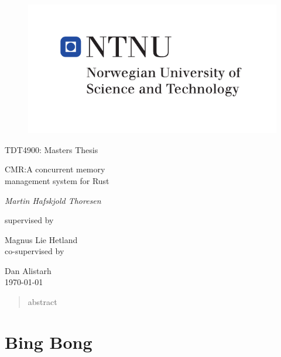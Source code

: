 \documentclass[b5paper,twoside]{report}
\theoremstyle{plain}
\theoremstyle{definition}
\begin{document}
\begin{titlepage}
  \centering
  \begin{figure}[h]
    \centering
    \includegraphics{hovedlogo_eng.pdf}
  \end{figure}
  \vspace{1.5cm}
  {\Large TDT4900: Masters Thesis \par}
  \vspace{1cm}
  {\huge CMR:\@ A concurrent memory\\ management system for Rust\par}
  \vspace{2cm}
  {\Large\itshape{}Martin Hafskjold Thoresen\par}
  \vfill
  supervised by\par
  {\large Magnus Lie Hetland}\\
  \vspace{0.2cm}
  co-supervised by\par
  {\large Dan Alistarh}\\
  \vspace{1cm}
  {\large \today\\}
\end{titlepage}



\begin{abstract}
  abstract
\end{abstract}

\tableofcontents
\listoffigures
\listoftables%


\part{Bing Bong}




\end{document}
